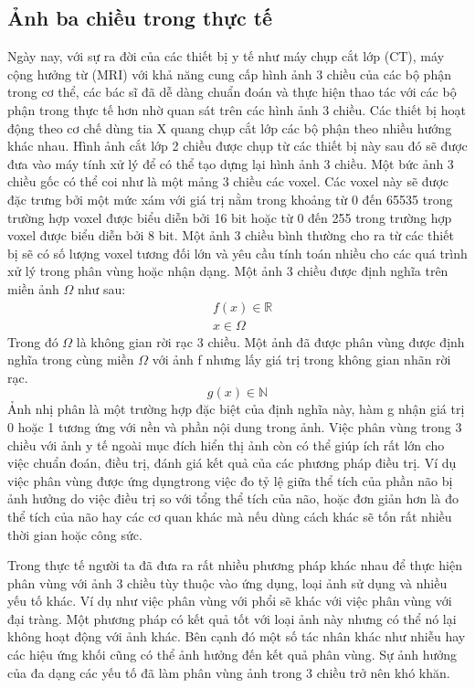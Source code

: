 \documentclass[12pt, oneside, a4]{book}
\begin{document}
\subsection{Ảnh ba chiều trong thực tế}
Ngày nay, với sự ra đời của các thiết bị y tế  như máy chụp cắt lớp (CT), máy cộng hưởng từ (MRI) với khả năng cung cấp hình ảnh 3 chiều của các bộ phận trong cơ thể, các bác sĩ đã dễ dàng chuẩn đoán và thực hiện thao tác với các bộ phận trong thực tế hơn nhờ quan sát trên các hình ảnh  3 chiều. Các thiết bị hoạt động theo cơ chế dùng tia X quang chụp cắt lớp các bộ phận theo nhiều hướng khác nhau. Hình ảnh cắt lớp 2 chiều được chụp từ các thiết bị này sau đó sẽ được đưa vào máy tính xử lý để có thể tạo dựng lại hình ảnh 3 chiều. Một bức ảnh 3 chiều gốc có thể coi như là một mảng 3 chiều các voxel. Các voxel này sẽ được đặc trưng bởi một mức xám với giá trị nằm trong khoảng từ 0 đến 65535 trong trường hợp voxel được biểu diễn bởi 16 bit hoặc từ 0 đến 255 trong trường hợp voxel được biểu diễn bởi 8 bit. Một ảnh 3 chiều bình thường cho ra từ các thiết bị sẽ có số lượng voxel tương đối lớn và yêu cầu tính toán nhiều cho các quá trình xử lý trong phân vùng hoặc nhận dạng. 
Một ảnh 3 chiều được định nghĩa trên miền ảnh $\Omega$ như sau: 
\begin{equation}
\begin{split}
&f(x)\in \mathbb{R}\\
&x\in \Omega
\end{split}
\end{equation} 
Trong đó $\Omega$ là không gian rời rạc 3 chiều. Một ảnh đã được phân vùng được định nghĩa trong cùng miền $\Omega$ với ảnh f nhưng lấy giá trị trong không gian nhãn rời rạc. 
\begin{equation}
g(x)\in \mathbb{N}
\end{equation}
Ảnh nhị phân là một trường hợp đặc biệt của định nghĩa này, hàm g nhận giá trị 0 hoặc 1 tương ứng với nền và phần nội dung trong ảnh. 
Việc  phân vùng trong 3 chiều với ảnh y tế ngoài mục đích hiển thị ảnh còn có thể giúp ích rất lớn cho việc chuẩn đoán, điều trị, đánh giá kết quả của các phương pháp điều trị. Ví dụ việc phân vùng được ứng dụngtrong việc đo tỷ lệ giữa thể tích của phần não bị ảnh hưởng do việc điều trị so với tổng thể tích của não, hoặc đơn giản hơn là đo thể tích của não hay các cơ quan khác mà nếu dùng cách khác sẽ tốn rất nhiều thời gian hoặc công sức.

Trong thực tế người ta đã đưa ra rất nhiều phương pháp khác nhau để thực hiện phân vùng với ảnh 3 chiều tùy thuộc vào ứng dụng, loại ảnh sử dụng và nhiều yếu tố khác. Ví dụ như việc phân vùng với phổi sẽ khác với việc phân vùng với đại tràng. Một phương pháp có kết quả tốt với loại ảnh này nhưng có thể nó lại không hoạt động với ảnh khác. Bên cạnh đó một số tác nhân khác như nhiễu hay các hiệu ứng khối cũng có thể ảnh hưởng đến kết quả phân vùng. Sự ảnh hưởng của đa dạng các yếu tố đã làm phân vùng ảnh trong 3 chiều trở nên khó khăn.
\end{document}
